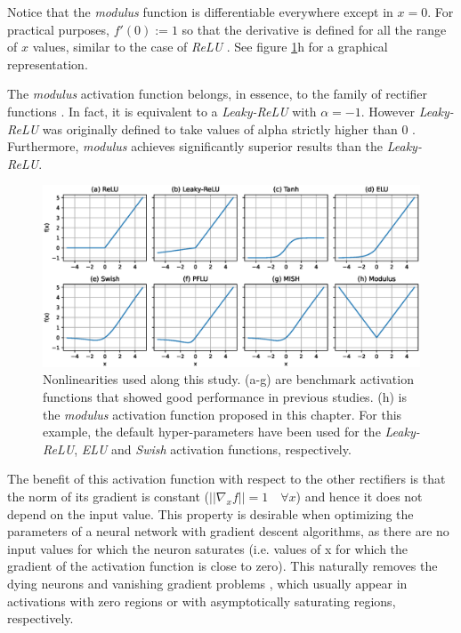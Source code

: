 Notice that the \textit{modulus} function is differentiable everywhere except in $x = 0$. For practical purposes,  $f'(0) := 1$  so that the derivative is defined for all the range of $x$ values, similar to the case of \textit{ReLU} \autocite{Goodfellow2016}. See figure \ref{fig:activations}h for a graphical representation.


The \textit{modulus} activation function belongs, in essence, to the family of rectifier functions \autocite{glorot2015} . In fact, it is equivalent to a \textit{Leaky-ReLU} with $\alpha=-1$. However \textit{Leaky-ReLU} was originally defined to take values of alpha strictly higher than 0 \autocite{xu2015}. Furthermore, \textit{modulus} achieves significantly superior results than the \textit{Leaky-ReLU}.

\begin{figure}[h!]
	\centering
	\includegraphics[width=1.0\linewidth]{modulus/images/activations}
	\caption[Nonlinearities compared with the \textit{modulus}]{Nonlinearities used along this study. (a-g) are benchmark activation functions that showed good performance in previous studies. (h) is the \textit{modulus} activation function proposed in this chapter. For this example, the default hyper-parameters have been used for the \textit{Leaky-ReLU}, \textit{ELU} and \textit{Swish} activation functions, respectively.
	}
	\label{fig:activations}
\end{figure}

The benefit of this activation function with respect to the other rectifiers is that the norm of its gradient is constant ($||\nabla_x f|| = 1 \quad \forall x$) and hence it does not depend on the input value. This property is desirable when optimizing the parameters of a neural network with gradient descent algorithms, as there are no input values for which the neuron saturates \autocite{glorot2010} (i.e. values of x for which the gradient of the activation function is close to zero). This naturally removes the dying neurons \autocite{lu2020} and vanishing gradient problems \autocite{pascanu13, hochreiter1998, Hochreiter2001}, which usually appear in activations with zero regions or with asymptotically saturating regions, respectively.

